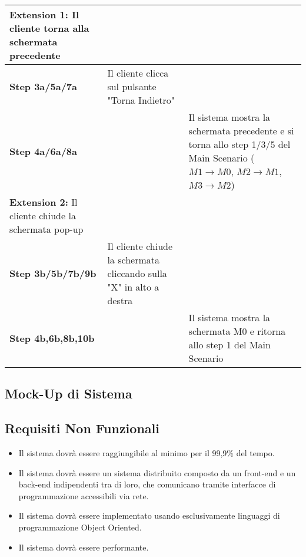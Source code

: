 \begin{longtable}{|m{5cm}|m{5cm}|m{5cm}|}
    \hline
        \textbf{Extension 1:} \newline  Il cliente torna alla schermata precedente & & \\
        \hline
        \textbf{Step 3a/5a/7a} & Il cliente clicca sul pulsante "Torna Indietro"&  \\
        \hline
        \textbf{Step 4a/6a/8a} & & Il sistema mostra la schermata precedente e si torna allo step 1/3/5 del Main Scenario ($M1 \to M0$, $M2 \to M1$, $M3 \to M2$) \\
        \hline
        \textbf{Extension 2:} \newline Il cliente chiude la schermata pop-up & & \\
        \hline
        \textbf{Step 3b/5b/7b/9b} & Il cliente chiude la schermata cliccando sulla "X" in alto a destra & \\
        \hline
        \textbf{Step 4b,6b,8b,10b} & & Il sistema mostra la schermata M0 e ritorna allo step 1 del Main Scenario \\
        \hline
    \end{longtable}
        \subsection{Mock-Up di Sistema}
        \subsection{Requisiti Non Funzionali}
            \begin{itemize}
                \item Il sistema dovrà essere raggiungibile al minimo per il 99,9\% del tempo.
                \item Il sistema dovrà essere un sistema distribuito composto da un front-end e un back-end indipendenti tra di loro, che comunicano tramite interfacce di programmazione accessibili via rete.
                \item Il sistema dovrà essere implementato usando esclusivamente linguaggi di programmazione Object Oriented.
                \item Il sistema dovrà essere performante.
        
            \end{itemize}


    

